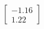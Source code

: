 \documentclass[preview]{standalone}
\begin{document}
\begin{align*}
\begin{bmatrix} -1.16 \\ 1.22 \end{bmatrix}
\end{align*}
\end{document}
